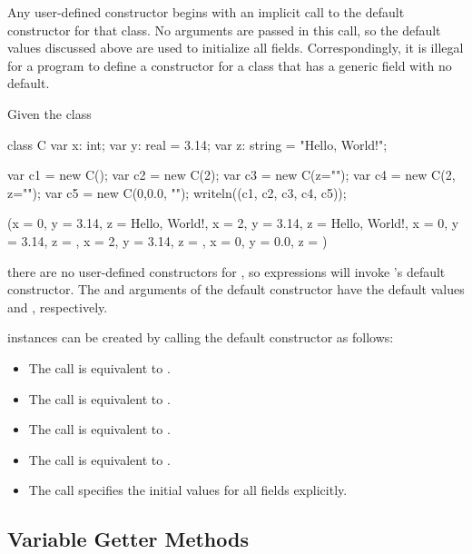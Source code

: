 Any user-defined constructor begins with an implicit call to the
default constructor for that class. No arguments are passed in this
call, so the default values discussed above are used to initialize all
fields. Correspondingly, it is illegal for a program to define a
constructor for a class that has a generic field with no default.

\begin{example}
Given the class
\begin{chapelpre}
\end{chapelpre}
\begin{chapel}
class C {
  var x: int;
  var y: real = 3.14;
  var z: string = "Hello, World!";
}
\end{chapel}
\begin{chapelpost}
var c1 = new C();
var c2 = new C(2);
var c3 = new C(z="");
var c4 = new C(2, z="");
var c5 = new C(0,0.0, "");
writeln((c1, c2, c3, c4, c5));
\end{chapelpost}
\begin{chapeloutput}
({x = 0, y = 3.14, z = Hello, World!}, {x = 2, y = 3.14, z = Hello, World!}, {x = 0, y = 3.14, z = }, {x = 2, y = 3.14, z = }, {x = 0, y = 0.0, z = })
\end{chapeloutput}
there are no user-defined constructors for , so  expressions
will invoke 's default constructor. The  and  arguments
of the default constructor have the default values  and
, respectively.

 instances can be created by calling the default constructor as follows:
\begin{itemize}
\item The call  is equivalent to .
\item The call  is equivalent to .
\item The call  is equivalent to .
\item The call  is equivalent to .
\item The call  specifies the initial values for all fields explicitly.
\end{itemize}
\end{example}

\subsection{Variable Getter Methods}
\label{Getter_Methods}

